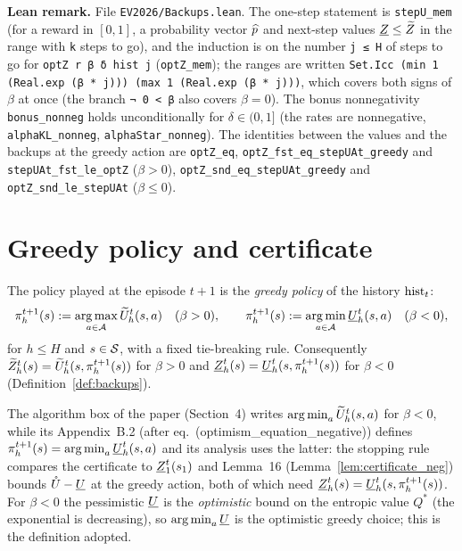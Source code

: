 \textbf{Lean remark.} File \texttt{EV2026/Backups.lean}. The one-step statement is
\texttt{stepU\_mem} (for a reward in $[0, 1]$, a probability vector $\widehat{p}$ and next-step values
$\underline{Z} \le \widetilde{Z}$ in the range with \texttt{k} steps to go), and the induction is on the number
\texttt{j ≤ H} of steps to go for \texttt{optZ r β δ hist j} (\texttt{optZ\_mem}); the ranges are
written \texttt{Set.Icc (min 1 (Real.exp (β * j))) (max 1 (Real.exp (β * j)))}, which covers both
signs of $\beta$ at once (the branch \texttt{¬ 0 < β} also covers $\beta = 0$). The bonus
nonnegativity \texttt{bonus\_nonneg} holds unconditionally for $\delta \in (0, 1]$ (the rates are
nonnegative, \texttt{alphaKL\_nonneg}, \texttt{alphaStar\_nonneg}). The identities between the
values and the backups at the greedy action are \texttt{optZ\_eq},
\texttt{optZ\_fst\_eq\_stepUAt\_greedy} and \texttt{stepUAt\_fst\_le\_optZ} ($\beta > 0$),
\texttt{optZ\_snd\_eq\_stepUAt\_greedy} and \texttt{optZ\_snd\_le\_stepUAt} ($\beta \le 0$).

\section{Greedy policy and certificate}
\label{sec:algorithm_certificate}

\begin{definition}\label{def:greedy}
\leanok
{}
The policy played at the episode $t + 1$ is the \emph{greedy policy} of the history $\mathrm{hist}_t$:
\[
  \pi^{t+1}_h(s) := \operatorname*{arg\,max}_{a \in \mathcal{A}} \widetilde{U}^t_h(s, a) \quad (\beta > 0),
  \qquad
  \pi^{t+1}_h(s) := \operatorname*{arg\,min}_{a \in \mathcal{A}} \underline{U}^t_h(s, a) \quad (\beta < 0),
\]
for $h \le H$ and $s \in \mathcal{S}$, with a fixed tie-breaking rule. Consequently
$\widetilde{Z}^t_h(s) = \widetilde{U}^t_h(s, \pi^{t+1}_h(s))$ for $\beta > 0$ and $\underline{Z}^t_h(s) = \underline{U}^t_h(s, \pi^{t+1}_h(s))$ for
$\beta < 0$ (Definition~\ref{def:backups}).
\end{definition}

\begin{remark}\label{rem:algorithm_greedy_neg}
The algorithm box of the paper (Section~4) writes $\operatorname*{arg\,min}_a \widetilde{U}^t_h(s, a)$ for $\beta < 0$, while
its Appendix~B.2 (after eq.~(optimism\_equation\_negative)) defines $\pi^{t+1}_h(s) = \operatorname*{arg\,min}_a \underline{U}^t_h(s, a)$
and its analysis uses the latter: the stopping rule compares the certificate to $\underline{Z}^t_1(s_1)$
and Lemma~16 (Lemma~\ref{lem:certificate_neg}) bounds $\mathring{U} - \underline{U}$ at the greedy action, both
of which need $\underline{Z}^t_h(s) = \underline{U}^t_h(s, \pi^{t+1}_h(s))$. For $\beta < 0$ the pessimistic $\underline{U}$ is
the \emph{optimistic} bound on the entropic value $Q^*$ (the exponential is decreasing), so
$\operatorname*{arg\,min}_a \underline{U}$ is the optimistic greedy choice; this is the definition adopted.
\end{remark}

